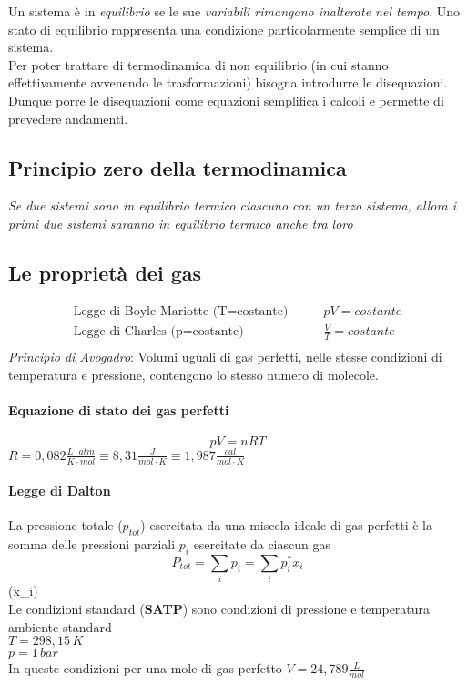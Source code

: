 \documentclass{article}
\newcommand{\ce}[1]{\begin{center}\textit{#1}\end{center}}
\begin{document}
Un sistema è in \textit{equilibrio} se le sue \textit{variabili rimangono inalterate nel tempo}. Uno stato di equilibrio rappresenta una condizione particolarmente semplice di un sistema. \\
Per poter trattare di termodinamica di non equilibrio (in cui stanno effettivamente avvenendo le trasformazioni) bisogna introdurre le disequazioni. Dunque porre le disequazioni come equazioni semplifica i calcoli e permette di prevedere andamenti.

\subsection{Principio zero della termodinamica} 
\ce{Se due sistemi sono in equilibrio termico ciascuno con un terzo sistema, allora i primi due sistemi saranno in equilibrio termico anche tra loro}

\subsection{Le proprietà dei gas}
\begin{align*}
    \text{Legge di Boyle-Mariotte (T=costante)} \quad&\quad pV=costante \\
    \text{Legge di Charles (p=costante)} \quad&\quad \frac{V}{T}=costante \\
\end{align*}
\textit{Principio di Avogadro}: Volumi uguali di gas perfetti, nelle stesse condizioni di temperatura e pressione, contengono lo stesso numero di molecole.
\paragraph{Equazione di stato dei gas perfetti}
\begin{equation}
    pV=nRT
\end{equation}
$R=0,082 \frac{L\cdot atm}{K\cdot mol} \equiv 8,31 \frac{J}{mol\cdot K}\equiv 1,987 \frac{cal}{mol\cdot K}$

\paragraph{Legge di Dalton}
La pressione totale ($p_{tot}$) esercitata da una miscela ideale di gas perfetti è la somma delle pressioni parziali $p_i$ esercitate da ciascun gas
\begin{equation*}
    P_{tot}=\sum_i p_i=\sum_i p_i^*x_i
\end{equation*}
(\gls{x_i})\\
Le condizioni standard (\textbf{SATP}) sono condizioni di pressione e temperatura ambiente standard
\\$T=298,15 \, K$
\\$p=1 \, bar$
\\ In queste condizioni per una mole di gas perfetto $V=24,789 \frac{L}{mol}$
\end{document}
